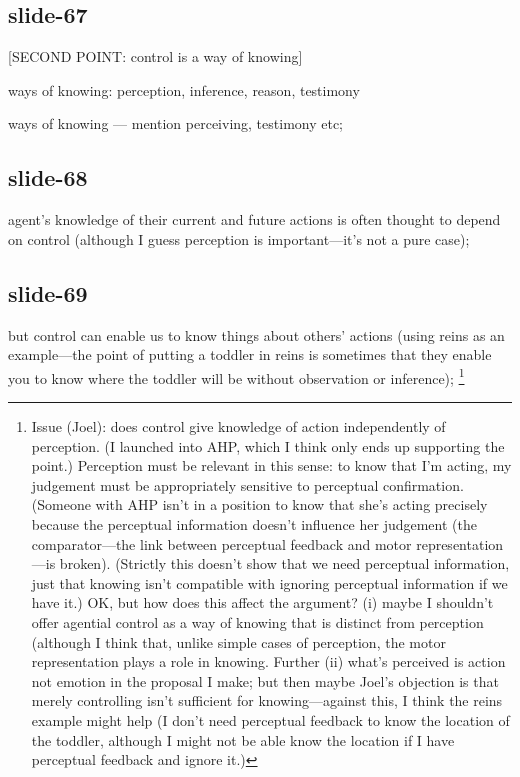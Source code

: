 \documentclass[12pt,\papersize]{extarticle}
\begin{document}
\subsection{slide-67}
[SECOND POINT: control is a way of knowing]

ways of knowing: perception, inference, reason, testimony

ways of knowing --- mention perceiving, testimony etc;

\subsection{slide-68}
agent’s knowledge of their current and future actions is often thought to depend on control (although I guess perception is important---it's not a pure case);

\subsection{slide-69}
but control can enable us to know things about others’ actions (using reins as an example---the point of putting a toddler in reins is sometimes that they enable you to know where the toddler will be without observation or inference);
\footnote{
Issue (Joel): does control give knowledge of action independently of perception.  (I launched into AHP, which I think only ends up supporting the point.)  Perception must be relevant in this sense: to know that I’m acting, my judgement must be appropriately sensitive to perceptual confirmation.  (Someone with AHP isn’t in a position to know that she’s acting precisely because the perceptual information doesn’t influence her judgement (the comparator---the link between perceptual feedback and motor representation---is broken).  (Strictly this doesn’t show that we need perceptual information, just that knowing isn’t compatible with ignoring perceptual information if  we have it.)  OK, but how does this affect the argument?  (i) maybe I shouldn’t offer agential control as a way of knowing that is distinct from perception (although I think that, unlike simple cases of perception, the motor representation plays a role in knowing.  Further (ii) what’s perceived is action not emotion in the proposal I make; but then maybe Joel’s objection is that merely controlling isn’t sufficient for knowing---against this, I think the reins example might help (I don’t need perceptual feedback to know the location of the toddler, although I might not be able know the location if I have perceptual feedback and ignore it.)
}
\end{document}

